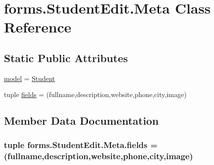 \hypertarget{classforms_1_1_student_edit_1_1_meta}{}\section{forms.\+Student\+Edit.\+Meta Class Reference}
\label{classforms_1_1_student_edit_1_1_meta}
\subsection*{Static Public Attributes}
\begin{DoxyCompactItemize}
\item 
\hyperlink{classforms_1_1_student_edit_1_1_meta_a809ec2e557f759854d783ce4937e2ec3}{model} = \hyperlink{classmodels_1_1_student}{Student}
\item 
tuple \hyperlink{classforms_1_1_student_edit_1_1_meta_a10edde5294b848474dd48c73c8aa34c4}{fields} = (\textquotesingle{}fullname\textquotesingle{},\textquotesingle{}description\textquotesingle{},\textquotesingle{}website\textquotesingle{},\textquotesingle{}phone\textquotesingle{},\textquotesingle{}city\textquotesingle{},\textquotesingle{}image\textquotesingle{})
\end{DoxyCompactItemize}


\subsection{Member Data Documentation}
\subsubsection[{\texorpdfstring{fields}{fields}}]{\setlength{\rightskip}{0pt plus 5cm}tuple forms.\+Student\+Edit.\+Meta.\+fields = (\textquotesingle{}fullname\textquotesingle{},\textquotesingle{}description\textquotesingle{},\textquotesingle{}website\textquotesingle{},\textquotesingle{}phone\textquotesingle{},\textquotesingle{}city\textquotesingle{},\textquotesingle{}image\textquotesingle{})\hspace{0.3cm}{\ttfamily [static]}}\hypertarget{classforms_1_1_student_edit_1_1_meta_a10edde5294b848474dd48c73c8aa34c4}{}\label{classforms_1_1_student_edit_1_1_meta_a10edde5294b848474dd48c73c8aa34c4}
